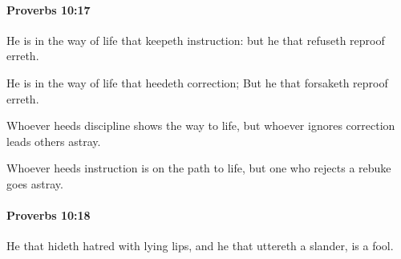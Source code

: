 		\paragraph{Proverbs 10:17} %
			\label{PROVERBS-10-17}

			He is in the way of life that keepeth instruction: but he that refuseth reproof erreth.

			\begin{versebox}
					\item[BHS] 
					\item[ASV] He is in the way of life that heedeth correction; But he that forsaketh reproof erreth.
					\item[NIV] Whoever heeds discipline shows the way to life, but whoever ignores correction leads others astray.
					\item[NRSV] Whoever heeds instruction is on the path to life, but one who rejects a rebuke goes astray.
			\end{versebox}

		\paragraph{Proverbs 10:18} %
			\label{PROVERBS-10-18}

			He that hideth hatred with lying lips, and he that uttereth a slander, is a fool.

